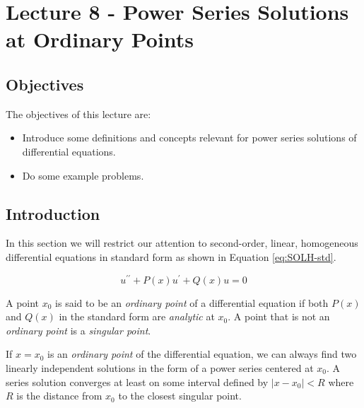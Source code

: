\chapter{Lecture 8 - Power Series Solutions at Ordinary Points}
\label{ch:lec8}
\section{Objectives}
The objectives of this lecture are:
\begin{itemize}
\item Introduce some definitions and concepts relevant for power series solutions of differential equations.
\item Do some example problems.
\end{itemize}

\section{Introduction}
In this section we will restrict our attention to second-order, linear, homogeneous differential equations in standard form as shown in Equation \ref{eq:SOLH-std}.

\begin{equation}
u^{\prime \prime}+P(x)u^{\prime}+Q(x)u=0
\label{eq:SOLH-std}
\end{equation}

 
\begin{definition}
A point $x_0$ is said to be an \emph{ordinary point} of a differential equation if both $P(x)$ and $Q(x)$ in the standard form are \emph{analytic} at $x_0$.  A point that is not an \emph{ordinary point} is a \emph{singular point}.
\end{definition}


\begin{theorem}
If $x=x_0$ is an \emph{ordinary point} of the differential equation, we can always find two linearly independent solutions in the form of a power series centered at $x_0$.  A series solution converges at least on some interval defined by $\left| x - x_0 \right|<R$ where $R$ is the distance from $x_0$ to the closest singular point.
\label{thm:existence-of-power-series-solutions}
\end{theorem}

